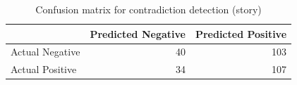 \begin{table}
\caption{Confusion matrix for contradiction detection (story)}
\label{tab:confusion_matrix}
\begin{tabular}{lrr}
\toprule
 & Predicted Negative & Predicted Positive \\
\midrule
Actual Negative & 40 & 103 \\
Actual Positive & 34 & 107 \\
\bottomrule
\end{tabular}
\end{table}
